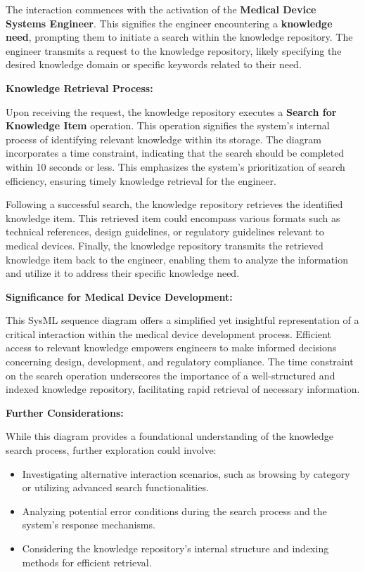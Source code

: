 \documentclass[
  letterpaper,
  DIV=11,
  numbers=noendperiod]{scrreprt}
\begin{document}
The interaction commences with the activation of the \textbf{Medical
Device Systems Engineer}. This signifies the engineer encountering a
\textbf{knowledge need}, prompting them to initiate a search within the
knowledge repository. The engineer transmits a request to the knowledge
repository, likely specifying the desired knowledge domain or specific
keywords related to their need.

\textbf{Knowledge Retrieval Process:}

Upon receiving the request, the knowledge repository executes a
\textbf{Search for Knowledge Item} operation. This operation signifies
the system's internal process of identifying relevant knowledge within
its storage. The diagram incorporates a time constraint, indicating that
the search should be completed within 10 seconds or less. This
emphasizes the system's prioritization of search efficiency, ensuring
timely knowledge retrieval for the engineer.

Following a successful search, the knowledge repository retrieves the
identified knowledge item. This retrieved item could encompass various
formats such as technical references, design guidelines, or regulatory
guidelines relevant to medical devices. Finally, the knowledge
repository transmits the retrieved knowledge item back to the engineer,
enabling them to analyze the information and utilize it to address their
specific knowledge need.

\textbf{Significance for Medical Device Development:}

This SysML sequence diagram offers a simplified yet insightful
representation of a critical interaction within the medical device
development process. Efficient access to relevant knowledge empowers
engineers to make informed decisions concerning design, development, and
regulatory compliance. The time constraint on the search operation
underscores the importance of a well-structured and indexed knowledge
repository, facilitating rapid retrieval of necessary information.

\textbf{Further Considerations:}

While this diagram provides a foundational understanding of the
knowledge search process, further exploration could involve:

\begin{itemize}
\item
  Investigating alternative interaction scenarios, such as browsing by
  category or utilizing advanced search functionalities.
\item
  Analyzing potential error conditions during the search process and the
  system's response mechanisms.
\item
  Considering the knowledge repository's internal structure and indexing
  methods for efficient retrieval.
\end{itemize}
\end{document}
